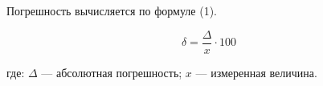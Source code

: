 Погрешность вычисляется по формуле (1).

\begin{equation}
  \delta = \frac{\Delta}{x} \cdot 100
\end{equation}

где: $\Delta$ — абсолютная погрешность; %
$x$ — измеренная величина.
